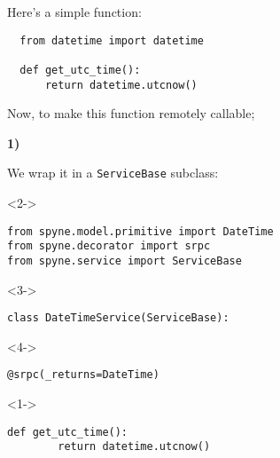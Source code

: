 \documentclass{beamer}
\begin{document}
\begin{frame}[fragile]
  \LARGE
\begin{center}

  Here's a simple function:

  \bigskip

  \bigskip

  \large

  \begin{lstlisting}
  from datetime import datetime

  def get_utc_time():
      return datetime.utcnow()
  \end{lstlisting}

\end{center}
\end{frame}

\begin{frame}
  \LARGE

  Now, to make this function remotely callable;

  \bigskip

\pause

  \color{red} \textbf{1)} \color{black}


    \begin{center}
      We wrap it in a \texttt{ServiceBase} subclass:
    \end{center}

\end{frame}

\begin{frame}[fragile]
\begin{uncoverenv}<2->
  \begin{lstlisting}[frame=none]
from spyne.model.primitive import DateTime
from spyne.decorator import srpc
from spyne.service import ServiceBase
  \end{lstlisting}
\end{uncoverenv}
\begin{uncoverenv}<3->
  \begin{lstlisting}[frame=none]
class DateTimeService(ServiceBase):
  \end{lstlisting}
  \vspace{-13pt}
\end{uncoverenv}
\begin{uncoverenv}<4->
  \begin{lstlisting}[frame=none]
    @srpc(_returns=DateTime)
  \end{lstlisting}
  \vspace{-13pt}
\end{uncoverenv}
\begin{uncoverenv}<1->
  \begin{lstlisting}[frame=none]
    def get_utc_time():
        return datetime.utcnow()
  \end{lstlisting}
\end{uncoverenv}
\end{frame}
\end{document}
